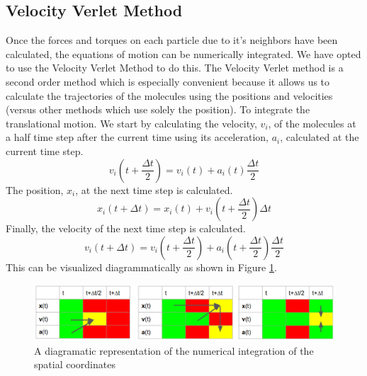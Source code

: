 \documentclass[preprint, aps]{revtex4-1}
\begin{document}
\subsection*{Velocity Verlet Method}
Once the forces and torques on each particle due to it's neighbors have been
calculated, the equations of motion can be numerically integrated. We have opted
to use the Velocity Verlet Method to do this. The Velocity Verlet method is a
second order method which is especially convenient because it allows us to
calculate the trajectories of the molecules using the positions and velocities
(versus other methods which use solely the position). To integrate the
translational motion. We start by calculating the velocity, $v_i$, of the
molecules at a half time step after the current time using its acceleration,
$a_i$, calculated at the current time step. 
	\begin{equation} \label{vv-v1}
		v_i(t+\frac{\Delta t}{2}) 
		= v_i(t) + a_i(t)\frac{\Delta t}{2}
	\end{equation}
The position, $x_i$, at the next time step is calculated.
	\begin{equation} \label{vv-x}
		x_i(t+\Delta t) 
		= x_i(t) + v_i(t+\frac{\Delta t}{2})\Delta t
	\end{equation}
Finally, the velocity of the next time step is calculated.
	\begin{equation} \label{vv-v2}
		v_i(t+\Delta t) 
		= v_i(t + \frac{\Delta t}{2}) 
		+ a_i(t + \frac{\Delta t}{2})\frac{\Delta t}{2}
	\end{equation}
This can be visualized diagrammatically as shown in Figure \ref{fig:vv}.
	\begin{figure}[H]
		\includegraphics[width=\textwidth]{vv.png}
		\caption{A diagramatic representation of the numerical integration of
			the spatial coordinates}
		\label{fig:vv}
	\end{figure}
\end{document}
